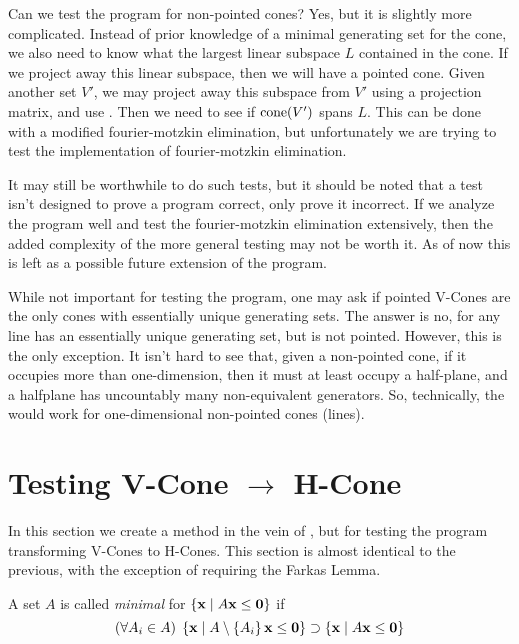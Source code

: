 \begin{Remark}
	Can we test the program for non-pointed cones?  Yes, but it is slightly more complicated.  Instead of prior knowledge of a minimal generating set for the cone, we also need to know what the largest linear subspace $L$ contained in the cone.  If we project away this linear subspace, then we will have a pointed cone.  Given another set $V'$, we may project away this subspace from $V'$ using a projection matrix, and use .  Then we need to see if $\operatorname{cone}(V')$ spans $L$.  This can be done with a modified fourier-motzkin elimination, but unfortunately we are trying to test the implementation of fourier-motzkin elimination.

	It may still be worthwhile to do such tests, but it should be noted that a test isn't designed to prove a program correct, only prove it incorrect.  If we analyze the program well and test the fourier-motzkin elimination extensively, then the added complexity of the more general testing may not be worth it.  As of now this is left as a possible future extension of the program.
\end{Remark}

\begin{Remark}
	While not important for testing the program, one may ask if pointed V-Cones are the only cones with essentially unique generating sets.  The answer is no, for any line has an essentially unique generating set, but is not pointed.  However, this is the only exception.  It isn't hard to see that, given a non-pointed cone, if it occupies more than one-dimension, then it must at least occupy a half-plane, and a halfplane has uncountably many non-equivalent generators.  So, technically, the  would work for one-dimensional non-pointed cones (lines).
\end{Remark}

\section{Testing V-Cone $\to$ H-Cone}

In this section we create a method in the vein of , but for testing the program transforming V-Cones to H-Cones.  This section is almost identical to the previous, with the exception of requiring the Farkas Lemma.

\begin{Def}
	A set $A$ is called \textit{minimal} for $\left\{\mathbf{x}\;|\; A\mathbf{x}\leq\mathbf{0}\right\}$ if
	\[ (\forall A_i \in A)\; \left\{\mathbf{x}\;|\; A\setminus\left\{A_i\right\}\mathbf{x}\leq\mathbf{0}\right\} \supset \left\{\mathbf{x}\;|\; A\mathbf{x}\leq\mathbf{0}\right\} \]
\end{Def}

